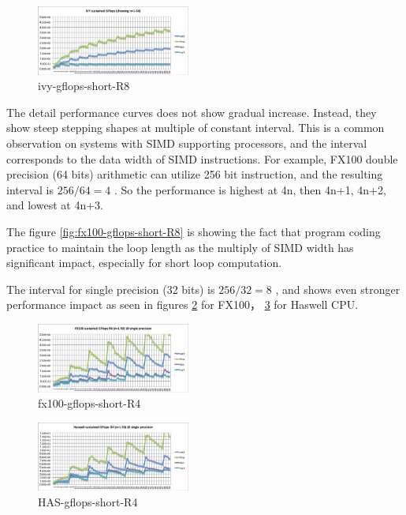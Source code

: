 \documentclass[conference]{IEEEtran}
\begin{document}
\begin{figure}[bt]
\centering
\includegraphics[width=0.45\textwidth]{figs/ivy-gflops-short-R8.pdf}
\caption{ivy-gflops-short-R8}
\label{fig:ivy-gflops-short-R8}
\end{figure}

The detail performance curves does not show gradual increase. Instead, they
show steep stepping shapes at multiple of constant interval.
This is a common observation on systems with SIMD supporting processors,
and the interval corresponds to the data width of SIMD instructions.
For example, FX100 double precision (64 bits) arithmetic can utilize
256 bit instruction, and the resulting interval is
\begin{math}
256 / 64 = 4
\end{math}
.
So the performance is highest at 4n, then 4n+1, 4n+2, and lowest at 4n+3.

The figure \ref{fig:fx100-gflops-short-R8} is showing the fact that
program coding practice to maintain the loop length as the multiply of
SIMD width has significant impact, especially for short loop computation.

The interval for single precision (32 bits) is
\begin{math}
256 / 32 = 8
\end{math}
, and shows even stronger performance impact as seen in figures
\ref{fig:fx100-gflops-short-R4} for FX100，
\ref{fig:HAS-gflops-short-R4} for Haswell CPU.

\begin{figure}[bt]
\centering
\includegraphics[width=0.45\textwidth]{figs/fx100-gflops-short-R4.pdf}
\caption{fx100-gflops-short-R4}
\label{fig:fx100-gflops-short-R4}
\end{figure}


\begin{figure}[bt]
\centering
\includegraphics[width=0.45\textwidth]{figs/HAS-gflops-short-R4.pdf}
\caption{HAS-gflops-short-R4}
\label{fig:HAS-gflops-short-R4}
\end{figure}
\end{document}
